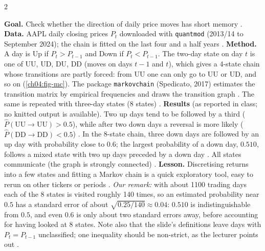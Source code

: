\begin{paracol}{2}
\begin{casestudy}
\textbf{Goal.} Check whether the direction of daily price moves has short memory .
\textbf{Data.} AAPL daily closing prices $P_t$ downloaded with \texttt{quantmod} (2013/14 to September 2024);
the chain is fitted on the last four and a half years .
\textbf{Method.} A day is Up if $P_t>P_{t-1}$ and Down if $P_t<P_{t-1}$. The two-day state on day $t$ is one
of UU, UD, DU, DD (moves on days $t-1$ and $t$), which gives a 4-state chain whose transitions are partly
forced: from UU one can only go to UU or UD, and so on (\cref{ch04:fig-mc}). The package
\texttt{markovchain} (Spedicato, 2017) estimates the transition matrix by empirical frequencies and draws the
transition graph . The same is repeated with three-day states (8 states) .
\textbf{Results} (as reported in class; no knitted output is available). Two up days tend to be followed by a
third ($\hat P(\mathrm{UU}\to\mathrm{UU})>0.5$), while after two down days a reversal is more likely
($\hat P(\mathrm{DD}\to\mathrm{DD})<0.5$) . In the 8-state chain, three down days are
followed by an up day with probability close to $0.6$; the largest probability of a down day, $0.510$,
follows a mixed state with two up days preceded by a down day . All states communicate
(the graph is strongly connected) .
\textbf{Lesson.} Discretising returns into a few states and fitting a Markov chain is a quick exploratory
tool, easy to rerun on other tickers or periods . \emph{Our remark:} with about 1100
trading days each of the 8 states is visited roughly 140 times, so an estimated probability near $0.5$ has a
standard error of about $\sqrt{0.25/140}\approx0.04$: $0.510$ is indistinguishable from $0.5$, and even
$0.6$ is only about two standard errors away, before accounting for having looked at 8 states. Note also that
the slide's definitions leave days with $P_t=P_{t-1}$ unclassified; one inequality should be
non-strict, as the lecturer points out .
\end{casestudy}


\end{paracol}
